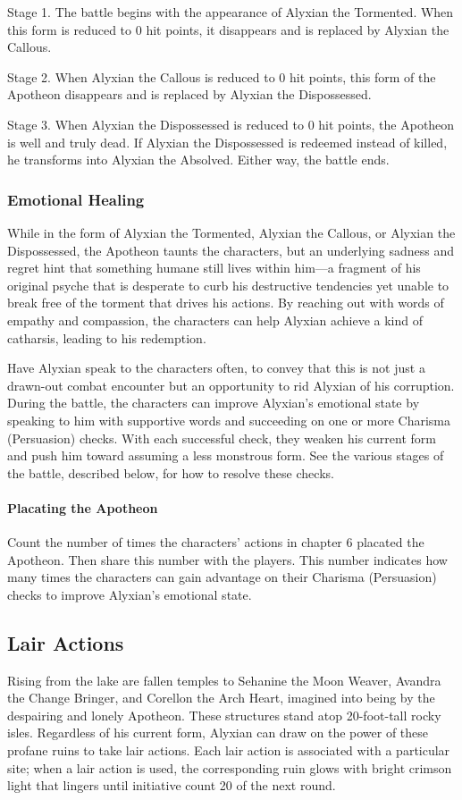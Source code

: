 \documentclass[10pt,a4paper,twoside,bg=print,twocolumn,openany,nodeprecatedcode]{dndbook}
\begin{document}
Stage 1. The battle begins with the appearance of Alyxian the Tormented. When this form is reduced to 0 hit points, it disappears and is replaced by Alyxian the Callous.

Stage 2. When Alyxian the Callous is reduced to 0 hit points, this form of the Apotheon disappears and is replaced by Alyxian the Dispossessed.

Stage 3. When Alyxian the Dispossessed is reduced to 0 hit points, the Apotheon is well and truly dead. If Alyxian the Dispossessed is redeemed instead of killed, he transforms into Alyxian the Absolved. Either way, the battle ends.

\subsubsection{Emotional Healing}
While in the form of Alyxian the Tormented, Alyxian the Callous, or Alyxian the Dispossessed, the Apotheon taunts the characters, but an underlying sadness and regret hint that something humane still lives within him—a fragment of his original psyche that is desperate to curb his destructive tendencies yet unable to break free of the torment that drives his actions. By reaching out with words of empathy and compassion, the characters can help Alyxian achieve a kind of catharsis, leading to his redemption.

Have Alyxian speak to the characters often, to convey that this is not just a drawn-out combat encounter but an opportunity to rid Alyxian of his corruption. During the battle, the characters can improve Alyxian's emotional state by speaking to him with supportive words and succeeding on one or more Charisma (Persuasion) checks. With each successful check, they weaken his current form and push him toward assuming a less monstrous form. See the various stages of the battle, described below, for how to resolve these checks.

\paragraph{Placating the Apotheon}
Count the number of times the characters' actions in chapter 6 placated the Apotheon. Then share this number with the players. This number indicates how many times the characters can gain advantage on their Charisma (Persuasion) checks to improve Alyxian's emotional state.

\subsection{Lair Actions}
Rising from the lake are fallen temples to Sehanine the Moon Weaver, Avandra the Change Bringer, and Corellon the Arch Heart, imagined into being by the despairing and lonely Apotheon. These structures stand atop 20-foot-tall rocky isles. Regardless of his current form, Alyxian can draw on the power of these profane ruins to take lair actions. Each lair action is associated with a particular site; when a lair action is used, the corresponding ruin glows with bright crimson light that lingers until initiative count 20 of the next round.
\end{document}
